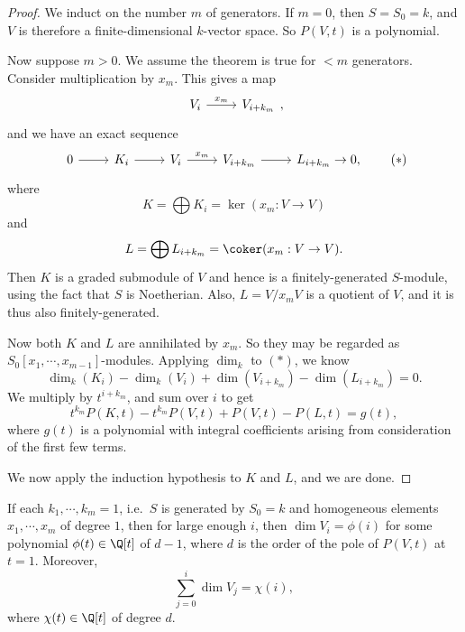 \documentclass[a4paper]{article}
\begin{document}
\begin{proof}
  We induct on the number $m$ of generators. If $m = 0$, then $S = S_0 = k$, and $V$ is therefore a finite-dimensional $k$-vector space. So $P(V, t)$ is a polynomial.

  Now suppose $m > 0$. We assume the theorem is true for $<m$ generators. Consider multiplication by $x_m$. This gives a map
  \[
    \begin{tikzcd}
      V_i \ar[r, "x_m"] & V_{i + k_m}
    \end{tikzcd},
  \]
  and we have an exact sequence
  \[
    \begin{tikzcd}
      0 \ar[r] & K_i \ar[r] & V_i \ar[r, "x_m"] & V_{i + k_m}\ar [r] & L_{i + k_m} \to 0,
    \end{tikzcd}\tag{$*$}
  \]
  where
  \[
    K = \bigoplus K_i = \ker (x_m: V \to V)
  \]
  and
  \[
    L = \bigoplus L_{i + k_m} = \coker (x_m: V \to V).
  \]
  Then $K$ is a graded submodule of $V$ and hence is a finitely-generated $S$-module, using the fact that $S$ is Noetherian. Also, $L = V/x_m V$ is a quotient of $V$, and it is thus also finitely-generated.

  Now both $K$ and $L$ are annihilated by $x_m$. So they may be regarded as $S_0[x_1, \cdots, x_{m - 1}]$-modules. Applying $\dim_k$ to $(*)$, we know
  \[
    \dim_k (K_i) - \dim_k (V_i) + \dim (V_{i + k_m}) - \dim (L_{i + k_m}) = 0.
  \]
  We multiply by $t^{i + k_m}$, and sum over $i$ to get
  \[
    t^{k_m} P(K, t) - t^{k_m} P(V, t) + P(V, t) - P(L, t) = g(t),
  \]
  where $g(t)$ is a polynomial with integral coefficients arising from consideration of the first few terms.

  We now apply the induction hypothesis to $K$ and $L$, and we are done.
\end{proof}

\begin{cor}
  If each $k_1, \cdots, k_m = 1$, i.e.\ $S$ is generated by $S_0 = k$ and homogeneous elements $x_1, \cdots, x_m$ of degree $1$, then for large enough $i$, then $\dim V_i = \phi(i)$ for some polynomial $\phi(t) \in \Q[t]$ of $d - 1$, where $d$ is the order of the pole of $P(V, t)$ at $t = 1$. Moreover,
  \[
    \sum_{j = 0}^i \dim V_j = \chi(i),
  \]
  where $\chi(t) \in \Q[t]$ of degree $d$.
\end{cor}
\end{document}

